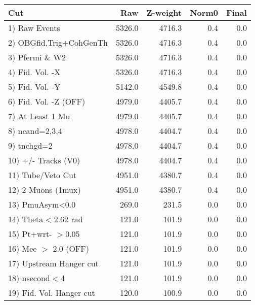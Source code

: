  \begin{table}[h!]\centering
 \begin{tabular}{||l||r|r|r|r||}
 \hline
 \hline
 Cut & Raw & Z-weight & Norm0 & Final \\
 \hline
  1) Raw Events           &      5326.0 &      4716.3 &         0.4 &         0.0 \\
  2) OBGfid,Trig+CohGenTh &      5326.0 &      4716.3 &         0.4 &         0.0 \\
  3) Pfermi \& W2         &      5326.0 &      4716.3 &         0.4 &         0.0 \\
  4) Fid. Vol. -X         &      5326.0 &      4716.3 &         0.4 &         0.0 \\
  5) Fid. Vol. -Y         &      5142.0 &      4549.8 &         0.4 &         0.0 \\
  6) Fid. Vol. -Z (OFF)   &      4979.0 &      4405.7 &         0.4 &         0.0 \\
  7) At Least 1 Mu        &      4979.0 &      4405.7 &         0.4 &         0.0 \\
  8) ncand=2,3,4          &      4978.0 &      4404.7 &         0.4 &         0.0 \\
  9) tnchgd=2             &      4978.0 &      4404.7 &         0.4 &         0.0 \\
 10) +/- Tracks (V0)      &      4978.0 &      4404.7 &         0.4 &         0.0 \\
 11) Tube/Veto Cut        &      4951.0 &      4380.7 &         0.4 &         0.0 \\
 12) 2 Muons (1mux)       &      4951.0 &      4380.7 &         0.4 &         0.0 \\
 13) PmuAsym<0.0          &       269.0 &       231.5 &         0.0 &         0.0 \\
 14) Theta$<$2.62 rad     &       121.0 &       101.9 &         0.0 &         0.0 \\
 15) Pt+wrt- $>$0.05      &       121.0 &       101.9 &         0.0 &         0.0 \\
 16) Mee $>$ 2.0  (OFF)   &       121.0 &       101.9 &         0.0 &         0.0 \\
 17) Upstream Hanger cut  &       121.0 &       101.9 &         0.0 &         0.0 \\
 18) nsecond$<$4          &       121.0 &       101.9 &         0.0 &         0.0 \\
 19) Fid. Vol. Hanger cut &       120.0 &       100.9 &         0.0 &         0.0 \\

\end{tabular}
\end{table}
